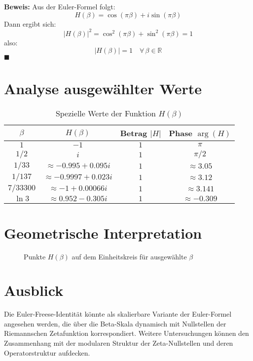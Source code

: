 \documentclass[12pt]{article}
\begin{document}
\textbf{Beweis:}
Aus der Euler-Formel folgt:
\[
H(\beta) = \cos(\pi\beta) + i\sin(\pi\beta)
\]
Dann ergibt sich:
\[
|H(\beta)|^2 = \cos^2(\pi\beta) + \sin^2(\pi\beta) = 1
\]
also:
\[
|H(\beta)| = 1 \quad \forall\, \beta \in \mathbb{R}
\]
\hfill$\blacksquare$

\section{Analyse ausgewählter Werte}

\begin{table}[H]
\centering
\begin{tabular}{|c|c|c|c|}
\hline
$\beta$ & $H(\beta)$ & Betrag $|H|$ & Phase $\arg(H)$ \\
\hline
$1$     & $-1$             & $1$ & $\pi$ \\
$1/2$   & $i$              & $1$ & $\pi/2$ \\
$1/33$  & $\approx -0.995 + 0.095i$ & $1$ & $\approx 3.05$ \\
$1/137$ & $\approx -0.9997 + 0.023i$ & $1$ & $\approx 3.12$ \\
$7/33300$ & $\approx -1 + 0.00066i$ & $1$ & $\approx 3.141$ \\
$\ln 3$ & $\approx 0.952 - 0.305i$ & $1$ & $\approx -0.309$ \\
\hline
\end{tabular}
\caption{Spezielle Werte der Funktion $H(\beta)$}
\end{table}

\section{Geometrische Interpretation}

\begin{figure}[H]
\centering
{}
\caption{Punkte $H(\beta)$ auf dem Einheitskreis für ausgewählte $\beta$}
\end{figure}

\section{Ausblick}

Die Euler-Freese-Identität könnte als skalierbare Variante der Euler-Formel angesehen werden, die über die Beta-Skala dynamisch mit Nullstellen der Riemannschen Zetafunktion korrespondiert. Weitere Untersuchungen können den Zusammenhang mit der modularen Struktur der Zeta-Nullstellen und deren Operatorstruktur aufdecken.
\end{document}
